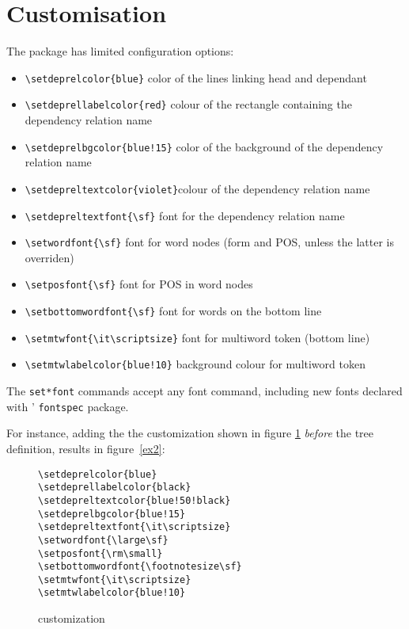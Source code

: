 \documentclass[12pt]{article}
\begin{document}
\section{Customisation}
The package has limited configuration options:
\begin{itemize}
\item \verb:\setdeprelcolor{blue}: color of the lines linking head and
  dependant
\item \verb:\setdeprellabelcolor{red}: colour of the rectangle
  containing the dependency relation name
\item \verb:\setdeprelbgcolor{blue!15}: color of the background of the
  dependency relation name
  
\item \verb:\setdepreltextcolor{violet}:colour of the dependency relation name
\item \verb:\setdepreltextfont{\sf}: font for the dependency relation  name
\item \verb:\setwordfont{\sf}: font for word nodes (form and POS, unless the latter is overriden)
\item \verb:\setposfont{\sf}: font for POS in word nodes
\item \verb:\setbottomwordfont{\sf}: font for words on the bottom line
\item \verb:\setmtwfont{\it\scriptsize}: font for multiword token (bottom line)
\item \verb:\setmtwlabelcolor{blue!10}: background colour for multiword token
\end{itemize}

The \verb:set*font: commands accept any font command, including new
fonts declared with \XeLaTeX' \verb:fontspec: package.

For instance, adding the the customization shown in figure \ref{def2}
\emph{before} 
the tree definition, results in figure~\ref{ex2}:

\begin{figure}[H]
\begin{verbatim}
\setdeprelcolor{blue}
\setdeprellabelcolor{black}
\setdepreltextcolor{blue!50!black}
\setdeprelbgcolor{blue!15}    
\setdepreltextfont{\it\scriptsize}
\setwordfont{\large\sf}
\setposfont{\rm\small}
\setbottomwordfont{\footnotesize\sf}
\setmtwfont{\it\scriptsize}
\setmtwlabelcolor{blue!10}
\end{verbatim}
\caption{customization}\label{def2}
\end{figure}
\end{document}

